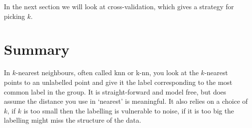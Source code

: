 \documentclass[12pt]{article}
\begin{document}
In the next section we will look at cross-validation, which gives a
strategy for picking $k$. 

\section*{Summary}
In $k$-nearest neighbours, often called knn or k-nn, you look at the
$k$-nearest points to an unlabelled point and give it the label
corresponding to the most common label in the group. It is
straight-forward and model free, but does assume the distance you use
in `nearest' is meaningful. It also relies on a choice of $k$, if $k$
is too small then the labelling is vulnerable to noise, if it is too
big the labelling might miss the structure of the data.
\end{document}
